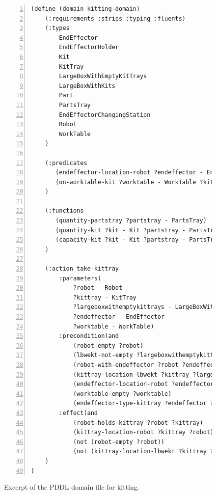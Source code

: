\begin{figure}[t!h!]
\begin{minipage}{.5\paperwidth}
\begin{mylisting}
\begin{Verbatim}[commandchars=\\\{\},fontsize=\scriptsize, numbers=left, numbersep=2pt]
(define (domain kitting-domain)
    (:requirements :strips :typing :fluents)
    (:types
        EndEffector
        EndEffectorHolder
        Kit
        KitTray
        LargeBoxWithEmptyKitTrays
        LargeBoxWithKits
        Part
        PartsTray
        EndEffectorChangingStation
        Robot
        WorkTable
    )

    (:predicates
	   (endeffector-location-robot ?endeffector - EndEffector ?robot - Robot)	
	   (on-worktable-kit ?worktable - WorkTable ?kit - Kit)
    )

    (:functions
	   (quantity-partstray ?partstray - PartsTray)
	   (quantity-kit ?kit - Kit ?partstray - PartsTray)
	   (capacity-kit ?kit - Kit ?partstray - PartsTray)
    )

    (:action take-kittray
        :parameters(
            ?robot - Robot
            ?kittray - KitTray
            ?largeboxwithemptykittrays - LargeBoxWithEmptyKitTrays
            ?endeffector - EndEffector
            ?worktable - WorkTable)
        :precondition(and
            (robot-empty ?robot)
            (lbwekt-not-empty ?largeboxwithemptykittrays)
            (robot-with-endeffector ?robot ?endeffector)
            (kittray-location-lbwekt ?kittray ?largeboxwithemptykittrays)
            (endeffector-location-robot ?endeffector ?robot)
            (worktable-empty ?worktable)
            (endeffector-type-kittray ?endeffector ?kittray))
        :effect(and
            (robot-holds-kittray ?robot ?kittray)
            (kittray-location-robot ?kittray ?robot)
            (not (robot-empty ?robot))
            (not (kittray-location-lbwekt ?kittray ?largeboxwithemptykittrays)))
    )
)

\end{Verbatim}
\end{mylisting}
\end{minipage}
\caption{Excerpt of the PDDL domain file for kitting.}
\label{fig:domain}
\end{figure}

